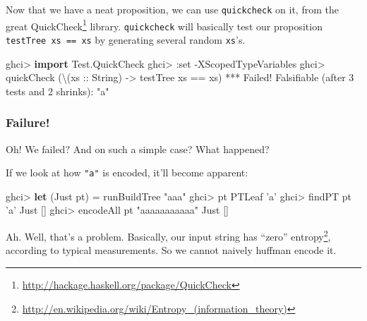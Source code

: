 \documentclass[]{article}
\newenvironment{Shaded}{\begin{snugshade}}{\end{snugshade}}
\newcommand{\CharTok}[1]{\textcolor[rgb]{0.31,0.60,0.02}{#1}}
\newcommand{\DataTypeTok}[1]{\textcolor[rgb]{0.13,0.29,0.53}{#1}}
\newcommand{\DecValTok}[1]{\textcolor[rgb]{0.00,0.00,0.81}{#1}}
\newcommand{\FunctionTok}[1]{\textcolor[rgb]{0.00,0.00,0.00}{#1}}
\newcommand{\KeywordTok}[1]{\textcolor[rgb]{0.13,0.29,0.53}{\textbf{#1}}}
\newcommand{\NormalTok}[1]{#1}
\newcommand{\OtherTok}[1]{\textcolor[rgb]{0.56,0.35,0.01}{#1}}
\newcommand{\StringTok}[1]{\textcolor[rgb]{0.31,0.60,0.02}{#1}}
\renewcommand{\href}[2]{#2\footnote{\url{#1}}}
\begin{document}
Now that we have a neat proposition, we can use \texttt{quickcheck} on it, from
the great \href{http://hackage.haskell.org/package/QuickCheck}{QuickCheck}
library. \texttt{quickcheck} will basically test our proposition
\texttt{testTree\ xs\ ==\ xs} by generating several random \texttt{xs}'s.

\begin{Shaded}
\begin{Highlighting}[]
\NormalTok{ghci}\FunctionTok{>} \KeywordTok{import} \DataTypeTok{Test.QuickCheck}
\NormalTok{ghci}\FunctionTok{>} \FunctionTok{:}\NormalTok{set }\FunctionTok{-}\DataTypeTok{XScopedTypeVariables}
\NormalTok{ghci}\FunctionTok{>}\NormalTok{ quickCheck (\textbackslash{}(}\OtherTok{xs ::} \DataTypeTok{String}\NormalTok{) }\OtherTok{->}\NormalTok{ testTree xs }\FunctionTok{==}\NormalTok{ xs)}
\FunctionTok{***} \DataTypeTok{Failed}\FunctionTok{!} \DataTypeTok{Falsifiable}\NormalTok{ (after }\DecValTok{3}\NormalTok{ tests and }\DecValTok{2}\NormalTok{ shrinks)}\FunctionTok{:}
\StringTok{"a"}
\end{Highlighting}
\end{Shaded}

\hypertarget{failure}{%
\subsubsection{Failure!}\label{failure}}

Oh! We failed? And on such a simple case? What happened?

If we look at how \texttt{"a"} is encoded, it'll become apparent:

\begin{Shaded}
\begin{Highlighting}[]
\NormalTok{ghci}\FunctionTok{>} \KeywordTok{let}\NormalTok{ (}\DataTypeTok{Just}\NormalTok{ pt) }\FunctionTok{=}\NormalTok{ runBuildTree }\StringTok{"aaa"}
\NormalTok{ghci}\FunctionTok{>}\NormalTok{ pt}
\DataTypeTok{PTLeaf} \CharTok{'a'}
\NormalTok{ghci}\FunctionTok{>}\NormalTok{ findPT pt }\CharTok{'a'}
\DataTypeTok{Just}\NormalTok{ []}
\NormalTok{ghci}\FunctionTok{>}\NormalTok{ encodeAll pt }\StringTok{"aaaaaaaaaaa"}
\DataTypeTok{Just}\NormalTok{ []}
\end{Highlighting}
\end{Shaded}

Ah. Well, that's a problem. Basically, our input string has
\href{http://en.wikipedia.org/wiki/Entropy_(information_theory)}{``zero''
entropy}, according to typical measurements. So we cannot naively huffman encode
it.
\end{document}
